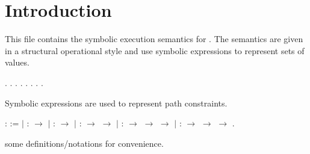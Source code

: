 \documentclass[12pt]{report}
\begin{document}

\begin{coqdoccode}
\end{coqdoccode}
\section{Introduction}

 This file contains the symbolic execution semantics for .
    The semantics are given in a structural operational style and
    use symbolic expressions to represent sets of values. 
\begin{coqdoccode}
\coqdocemptyline
\coqdocnoindent
{}      .\coqdoceol
\coqdocnoindent
{}        .\coqdoceol
\coqdocindent{7.00em}
  .\coqdoceol
\coqdocnoindent
{}        .\coqdoceol
\coqdocnoindent
{}  .\coqdoceol
\coqdocemptyline
\coqdocnoindent
{}  .\coqdoceol
\coqdocnoindent
{}  .\coqdoceol
\coqdocnoindent
{}  .\coqdoceol
\coqdocemptyline
\end{coqdoccode}
Symbolic expressions are used to represent path constraints.
 
\begin{coqdoccode}
\coqdocnoindent
{}  :  :=\coqdoceol
\coqdocindent{1.00em}
\ensuremath{|} :  \ensuremath{\rightarrow} \coqdoceol
\coqdocnoindent
\coqdoceol
\coqdocindent{1.00em}
\ensuremath{|}  :   \ensuremath{\rightarrow} \coqdoceol
\coqdocindent{1.00em}
\coqdoceol
\coqdocindent{1.00em}
\ensuremath{|}    :  \ensuremath{\rightarrow}  \ensuremath{\rightarrow} \coqdoceol
\coqdocindent{1.00em}
\ensuremath{|}    :  \ensuremath{\rightarrow}  \ensuremath{\rightarrow}  \ensuremath{\rightarrow} \coqdoceol
\coqdocindent{1.00em}
\ensuremath{|}   :  \ensuremath{\rightarrow}  \ensuremath{\rightarrow}  \ensuremath{\rightarrow} \coqdoceol
\coqdocindent{1.00em}
.\coqdoceol
\coqdocemptyline
\end{coqdoccode}
some definitions/notations for convenience.
 
\end{document}
